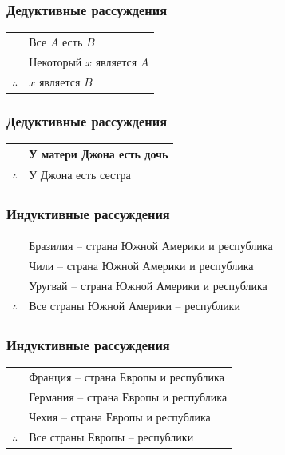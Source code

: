 \documentclass[24pt,pdf,hyperref={unicode},aspectratio=169]{beamer}
\begin{document}
\begin{frame}\frametitle{Дедуктивные рассуждения}
\begin{tabular}{l l}
 & Все $A$ есть $B$\\
 & Некоторый $x$ является $A$\\
 \hline
$\therefore$ & $x$ является $B$ \\
\end{tabular}
\end{frame}

\begin{frame}\frametitle{Дедуктивные рассуждения}
\begin{tabular}{l l}
 & У матери Джона есть дочь\\
 \hline
$\therefore$ & У Джона есть сестра \\
\end{tabular}
\end{frame}



\begin{frame}\frametitle{Индуктивные рассуждения}
\begin{tabular}{l l}
 & Бразилия -- страна Южной Америки и республика \\
 & Чили -- страна Южной Америки и республика \\
 & Уругвай -- страна Южной Америки и республика \\
\hline
$\therefore$ & Все страны Южной Америки -- республики \\
\end{tabular}
\end{frame}

\begin{frame}\frametitle{Индуктивные рассуждения}
\begin{tabular}{l l}
 & Франция -- страна Европы и республика \\
 & Германия -- страна Европы и республика \\
 & Чехия -- страна Европы и республика \\
\hline
$\therefore$ & Все страны Европы -- республики \\
\end{tabular}
\begin{flushright}
\end{flushright}
\end{frame}
\end{document}

